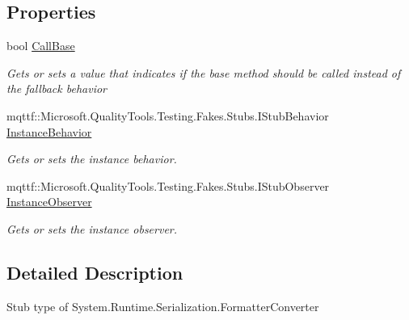 \subsection*{Properties}
\begin{DoxyCompactItemize}
\item 
bool \hyperlink{class_system_1_1_runtime_1_1_serialization_1_1_fakes_1_1_stub_formatter_converter_a73417db27a3aac931c093f9ca38efb95}{Call\-Base}
\begin{DoxyCompactList}\small\item\em Gets or sets a value that indicates if the base method should be called instead of the fallback behavior\end{DoxyCompactList}\item 
mqttf\-::\-Microsoft.\-Quality\-Tools.\-Testing.\-Fakes.\-Stubs.\-I\-Stub\-Behavior \hyperlink{class_system_1_1_runtime_1_1_serialization_1_1_fakes_1_1_stub_formatter_converter_a93d4ac7c2eae7a76191b16f2720ca0cd}{Instance\-Behavior}
\begin{DoxyCompactList}\small\item\em Gets or sets the instance behavior.\end{DoxyCompactList}\item 
mqttf\-::\-Microsoft.\-Quality\-Tools.\-Testing.\-Fakes.\-Stubs.\-I\-Stub\-Observer \hyperlink{class_system_1_1_runtime_1_1_serialization_1_1_fakes_1_1_stub_formatter_converter_a8f78bde6c5dd708848ea8607ac89ea65}{Instance\-Observer}
\begin{DoxyCompactList}\small\item\em Gets or sets the instance observer.\end{DoxyCompactList}\end{DoxyCompactItemize}


\subsection{Detailed Description}
Stub type of System.\-Runtime.\-Serialization.\-Formatter\-Converter



